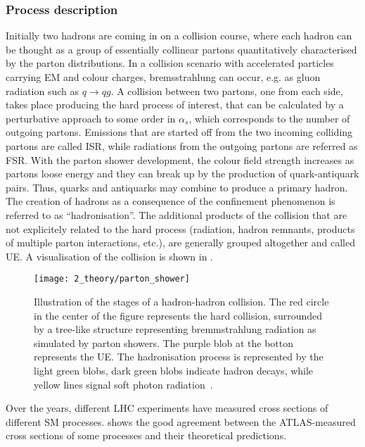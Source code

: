\subsubsection{Process description}

Initially two hadrons are coming in on a collision course, where each hadron can be thought as a group of essentially collinear partons quantitatively characterised by the parton distributions. In a collision scenario with accelerated particles carrying \ac{EM} and colour charges, bremsstrahlung can occur, e.g. as gluon radiation such as \(q \to qg\). A collision between two partons, one from each side, takes place producing the hard process of interest, that can be calculated by a perturbative approach to some order in \(\alpha_s\), which corresponds to the number of outgoing partons. Emissions that are started off from the two incoming colliding partons are called \ac{ISR}, while radiations from the outgoing partons are referred as \ac{FSR}. With the parton shower development, the colour field strength increases as partons loose energy and they can break up by the production of quark-antiquark pairs. Thus, quarks and antiquarks may combine to produce a primary hadron. The creation of hadrons as a consequence of the confinement phenomenon is referred to as “hadronisation”. The additional products of the collision that are not explicitely related to the hard process (radiation, hadron remnants, products of multiple parton interactions, etc.), are generally grouped altogether and called \ac{UE}. A visualisation of the \pp collision is shown in \Fig{\ref{fig:theory:sm:hadron_interactions:parton_shower}}.



\begin{figure}[ht!]
    \centering
    \texttt{[image: 2\_theory/parton\_shower]}
    \caption{Illustration of the stages of a hadron-hadron collision. The red circle in the center of the figure represents the hard collision, surrounded by a tree-like structure representing bremmstrahlung radiation as simulated by parton showers. The purple blob at the botton represents the \ac{UE}. The hadronisation process is represented by the light green blobs, dark green blobs indicate hadron decays, while yellow lines signal soft photon radiation~\cite{Hoche-2015}.}
    \label{fig:theory:sm:hadron_interactions:parton_shower}
\end{figure}



Over the years, different \ac{LHC} experiments have measured cross sections of different \ac{SM} processes. \Fig{\ref{fig:theory:sm:hadron_interactions:sm_results}} shows the good agreement between the \ac{ATLAS}-measured cross sections of some processes and their theoretical predictions.


